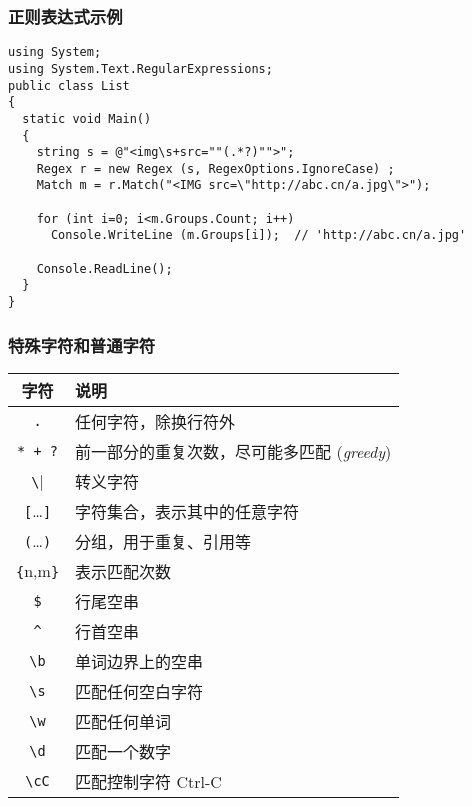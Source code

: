 \begin{frame}[fragile]
\frametitle{正则表达式示例}
\begin{lstlisting}[escapeinside='']
using System;
using System.Text.RegularExpressions;
public class List
{
  static void Main()
  {
    string s = @"<img\s+src=""(.*?)"">";
    Regex r = new Regex (s, RegexOptions.IgnoreCase) ;
    Match m = r.Match("<IMG src=\"http://abc.cn/a.jpg\">");

    for (int i=0; i<m.Groups.Count; i++)
      Console.WriteLine (m.Groups[i]);  // 'http://abc.cn/a.jpg'

    Console.ReadLine();
  }
}
\end{lstlisting}
\end{frame}

\begin{frame}[fragile]
\frametitle{特殊字符和普通字符}
\begin{tabular}{c|l}
\hline
字符                  & 说明                                               \\
\hline
\verb|.|              & 任何字符，除换行符外                               \\
\verb|* + ?|          & 前一部分的重复次数，尽可能多匹配 (\textit{greedy}) \\
\verb|\|              & 转义字符                                           \\
\verb|[|\dots\verb|]| & 字符集合，表示其中的任意字符                       \\
\verb|(|\dots\verb|)| & 分组，用于重复、引用等                             \\
\verb|{|n,m\verb|}|   & 表示匹配次数                                       \\
\verb|$|              & 行尾空串                                           \\
\verb|^|              & 行首空串                                           \\
\hline
\verb|\b|             & 单词边界上的空串                                   \\
\verb|\s|             & 匹配任何空白字符                                   \\
\verb|\w|             & 匹配任何单词                                       \\
\verb|\d|             & 匹配一个数字                                       \\
\verb|\cC|            & 匹配控制字符 Ctrl-C                               \\
\hline
\end{tabular}
\end{frame}

